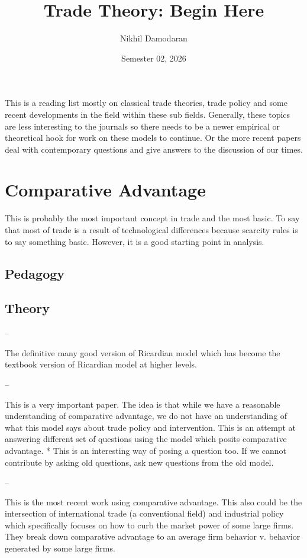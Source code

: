\documentclass[12pt]{article}
\title{Trade Theory: Begin Here}
\date{Semester 02, 2026}
\author{Nikhil Damodaran}
\begin{document}
\maketitle


This is a reading list mostly on classical trade theories, trade policy and some recent developments in the field within these sub fields. Generally, these topics are less interesting to the journals so there needs to be a newer empirical or theoretical hook for work on these models to continue. Or the more recent papers deal with contemporary questions and give answers to the discussion of our times.

\section{Comparative Advantage}
This is probably the most important concept in trade and the most basic. To say that most of trade is a result of technological differences because scarcity rules is to say something basic. However, it is a good starting point in analysis.

\subsection{Pedagogy}
\cite{Findlay1987D}

\cite{Bernhofen2018JEP}

\subsection{Theory}
-- \cite{Dornbusch1977AER}

The definitive many good version of Ricardian model which has become the textbook version of Ricardian model at higher levels.

-- \cite{Costinot2015QJE}

This is a very important paper. The idea is that while we have a reasonable understanding of comparative advantage, we do not have an understanding of what this model says about trade policy and intervention. This is an attempt at answering different set of questions using the model which posits comparative advantage. * This is an interesting way of posing a question too. If we cannot contribute by asking old questions, ask new questions from the old model.

-- \cite{Gaubert2021JPE}

This is the most recent work using comparative advantage. This also could be the intersection of international trade (a conventional field) and industrial policy which specifically focuses on how to curb the market power of some large firms. They break down comparative advantage to an average firm behavior v. behavior generated by some large firms.
\end{document}
